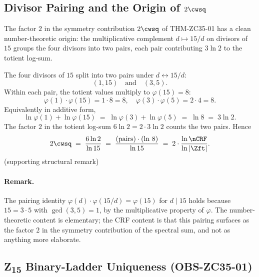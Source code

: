 \documentclass[12pt, a4paper]{article}
\begin{document}
\subsection{Divisor Pairing and the Origin of $2\cwsq$}
\label{sec:pairing}

The factor $2$ in the symmetry contribution $2\cwsq$ of THM-ZC35-01 has
a clean number-theoretic origin: the multiplicative complement
$d \mapsto 15/d$ on divisors of $15$ groups the four divisors into two
pairs, each pair contributing $3\ln 2$ to the totient log-sum.

\begin{derivedbox}[title={Divisor pairing structure of $\Zft$}]
The four divisors of $15$ split into two pairs under
$d \leftrightarrow 15/d$:
\[
  (1,15)\quad\text{and}\quad (3,5).
\]
Within each pair, the totient values multiply to $\varphi(15) = 8$:
\[
  \varphi(1)\cdot\varphi(15) = 1\cdot 8 = 8,
  \quad
  \varphi(3)\cdot\varphi(5) = 2\cdot 4 = 8.
\]
Equivalently in additive form,
\[
  \ln\varphi(1) + \ln\varphi(15)
  \;=\; \ln\varphi(3) + \ln\varphi(5)
  \;=\; \ln 8 \;=\; 3 \ln 2.
\]
The factor $2$ in the totient log-sum $6\ln 2 = 2 \cdot 3 \ln 2$ counts
the two pairs. Hence
\[
  2\cwsq \;=\; \frac{6 \ln 2}{\ln 15}
  \;=\; \frac{(\text{pairs}) \cdot (\text{ln 8})}{\ln 15}
  \;=\; 2 \cdot \frac{\ln\nCRF}{\ln|\Zft|}.
\]
\hfill\textup{(supporting structural remark)}
\end{derivedbox}

\paragraph{Remark.}
The pairing identity $\varphi(d)\cdot\varphi(15/d) = \varphi(15)$ for
$d \mid 15$ holds because $15 = 3 \cdot 5$ with $\gcd(3,5) = 1$, by the
multiplicative property of $\varphi$. The number-theoretic content is
elementary; the CRF content is that this pairing surfaces as the
factor $2$ in the symmetry contribution of the spectral sum, and not
as anything more elaborate.

\subsection{Z\textsubscript{15} Binary-Ladder Uniqueness (OBS-ZC35-01)}
\label{sec:obs-zc35-01}
\end{document}
